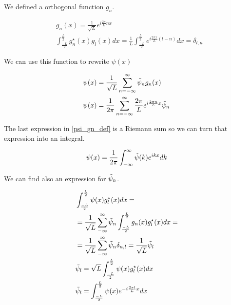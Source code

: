 We defined a orthogonal function $g_n$.

\begin{equation}
    \label{gn_def}
    \begin{split}
        & g_n(x) = \frac{1}{\sqrt{L}}e^{i\frac{2\pi}{L}nx}\\
        & \int_{\frac{-L}{2}}^{\frac{L}{2}}g_{n}^{\star}(x)g_{l}(x) dx = \frac{1}{L}\int_{\frac{-L}{2}}^{\frac{L}{2}} e^{i\frac{2\pi x}{L}(l-n)}dx = \delta_{l,n} 
    \end{split}
\end{equation}


We can use this function to rewrite $\psi(x)$

\begin{equation}
    \label{psi_gn_def} 
\begin{split}
    &\psi(x) = \frac{1}{\sqrt{L}}\sum_{n=-\infty}^{\infty}\Tilde{\psi}_n g_n(x)\\
    &\psi(x) = \frac{1}{2\pi}\sum_{n=-\infty}^{\infty} \frac{2\pi}{L}e^{i\frac{2\pi n}{L}x}\Tilde{\psi}_n
    \end{split}
\end{equation}

The last expression in \ref{psi_gn_def} is a Riemann sum so we can turn that expression into an integral.

\begin{equation}
    \label{psi_gn_final} 
\psi(x) = \frac{1}{2\pi} \int_{-\infty}^{\infty} \Tilde{\psi}(k)e^{ikx}dk
\end{equation}

We can find also an expression for $\Tilde{\psi}_n$.

\begin{equation}
    \label{til_psi_def_int} 
\begin{split}
    & \int_{\frac{-L}{2}}^{\frac{L}{2}} \psi(x) g_l^{\star}(x) dx =
    \\
    & = \frac{1}{\sqrt{L}} \sum_{-\infty}^{\infty} \Tilde{\psi}_n\int_{\frac{-L}{2}}^{\frac{L}{2}} g_n(x) g_l^{\star}(x) dx =
    \\
    & = \frac{1}{\sqrt{L}} \sum_{-\infty}^{\infty} \Tilde{\psi}_n \delta_{n,l} = \frac{1}{\sqrt{L}} \Tilde{\psi}_l
    \\
    & \Tilde{\psi}_l = \sqrt{L} \int_{\frac{-L}{2}}^{\frac{L}{2}} \psi(x) g_l^{\star}(x) dx
    \\
    & \Tilde{\psi}_l = \int_{\frac{-L}{2}}^{\frac{L}{2}} \psi(x) e^{-i\frac{2\pi l}{L}x} dx
    \end{split}
\end{equation}

